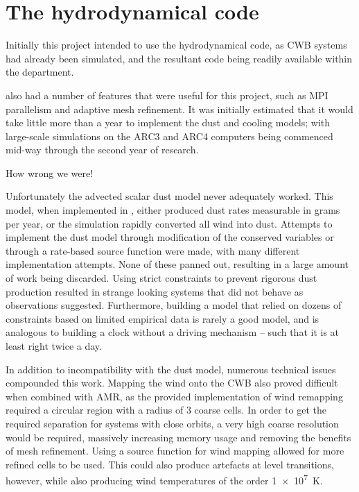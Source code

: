 \section{The \mg{} hydrodynamical code}
\label{sec:mgcode}


Initially this project intended to use the \mg{} hydrodynamical code, as CWB systems had already been simulated, and the resultant code being readily available within the department.

\mg{} also had a number of features that were useful for this project, such as MPI parallelism and adaptive mesh refinement.
It was initially estimated that it would take little more than a year to implement the dust and cooling models; with large-scale simulations on the ARC3 and ARC4 computers being commenced mid-way through the second year of research.

How wrong we were!


Unfortunately the advected scalar dust model never adequately worked.
This model, when implemented in \mg, either produced dust rates measurable in grams per year, or the simulation rapidly converted all wind into dust.
Attempts to implement the dust model through modification of the conserved variables or through a rate-based source function were made, with many different implementation attempts.
None of these panned out, resulting in a large amount of work being discarded.
Using strict constraints to prevent rigorous dust production resulted in strange looking systems that did not behave as observations suggested.
Furthermore, building a model that relied on dozens of constraints based on limited empirical data is rarely a good model, and is analogous to building a clock without a driving mechanism -- such that it is at least right twice a day.

In addition to incompatibility with the dust model, numerous technical issues compounded this work.
Mapping the wind onto the CWB also proved difficult when combined with AMR, as the provided implementation of wind remapping required a circular region with a radius of 3 coarse cells.
In order to get the required separation for systems with close orbits, a very high coarse resolution would be required, massively increasing memory usage and removing the benefits of mesh refinement.
Using a source function for wind mapping allowed for more refined cells to be used.
This could also produce artefacts at level transitions, however, while also producing wind temperatures of the order \SI{1e7}{K}.

